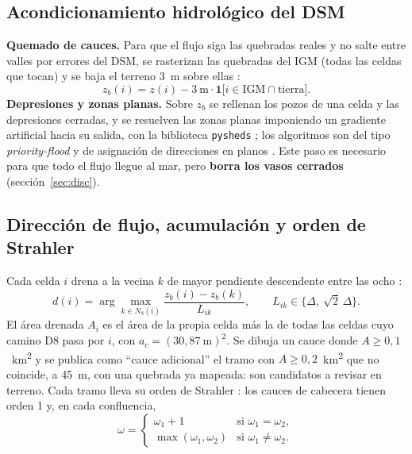 \documentclass{sosg-informe}
\newcommand{\kmc}{km\textsuperscript{2}}
\begin{document}
\subsection{Acondicionamiento hidrológico del DSM}
\textbf{Quemado de cauces.} Para que el flujo siga las quebradas reales y no salte entre valles por errores del DSM, se rasterizan las quebradas del IGM (todas las celdas que tocan) y se baja el terreno 3~m sobre ellas \citep{lindsay2016}:
\begin{equation}
  z_b(i) = z(i) - 3\ \text{m}\cdot \mathbf{1}\bigl[i \in \text{IGM} \cap \text{tierra}\bigr].
\end{equation}
\textbf{Depresiones y zonas planas.} Sobre $z_b$ se rellenan los pozos de una celda y las depresiones cerradas, y se resuelven las zonas planas imponiendo un gradiente artificial hacia su salida, con la biblioteca \texttt{pysheds} \citep{bartos2020}; los algoritmos son del tipo \emph{priority-flood} \citep{barnes2014pf} y de asignación de direcciones en planos \citep{barnes2014flats}. Este paso es necesario para que todo el flujo llegue al mar, pero \textbf{borra los vasos cerrados} (sección~\ref{sec:disc}).

\subsection{Dirección de flujo, acumulación y orden de Strahler}
Cada celda $i$ drena a la vecina $k$ de mayor pendiente descendente entre las ocho \citep[D8;][]{ocallaghan1984}:
\begin{equation}
  d(i) = \arg\max_{k \in N_8(i)} \frac{z_b(i) - z_b(k)}{L_{ik}}, \qquad L_{ik} \in \{\Delta,\ \sqrt{2}\,\Delta\}.
\end{equation}
El área drenada $A_i$ es el área de la propia celda más la de todas las celdas cuyo camino D8 pasa por $i$, con $a_c = (30{,}87\ \text{m})^2$. Se dibuja un cauce donde $A \geq 0{,}1$~\kmc{} y se publica como \enquote{cauce adicional} el tramo con $A \geq 0{,}2$~\kmc{} que no coincide, a 45~m, con una quebrada ya mapeada: son candidatos a revisar en terreno. Cada tramo lleva su orden de Strahler \citep{strahler1957}: los cauces de cabecera tienen orden 1 y, en cada confluencia,
\begin{equation}
  \omega = \begin{cases} \omega_1 + 1 & \text{si } \omega_1 = \omega_2,\\ \max(\omega_1, \omega_2) & \text{si } \omega_1 \neq \omega_2.\end{cases}
\end{equation}
\end{document}
